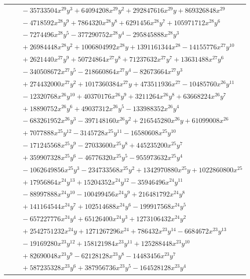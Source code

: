 \documentclass[11pt]{article}
\begin{document}
\begin{longtable}{@{}ll@{}}
 & $\quad -35733504x^{29}y^{3}+64094208x^{29}y^{2}+292847616x^{29}y+869326848x^{29}$\\
 & $\quad -4718592x^{28}y^{9}+7864320x^{28}y^{8}+6291456x^{28}y^{7}+105971712x^{28}y^{6}$\\
 & $\quad -7274496x^{28}y^{5}-377290752x^{28}y^{4}-295845888x^{28}y^{3}$\\
 & $\quad +26984448x^{28}y^{2}+1006804992x^{28}y+1391161344x^{28}-14155776x^{27}y^{10}$\\
 & $\quad +2621440x^{27}y^{9}+50724864x^{27}y^{8}+71237632x^{27}y^{7}+13631488x^{27}y^{6}$\\
 & $\quad -340508672x^{27}y^{5}-218660864x^{27}y^{4}-82673664x^{27}y^{3}$\\
 & $\quad +274432000x^{27}y^{2}+1017360384x^{27}y+473511936x^{27}-10485760x^{26}y^{11}$\\
 & $\quad -12320768x^{26}y^{10}+40370176x^{26}y^{9}+3211264x^{26}y^{8}+63668224x^{26}y^{7}$\\
 & $\quad +18890752x^{26}y^{6}+49037312x^{26}y^{5}-133988352x^{26}y^{4}$\\
 & $\quad -683261952x^{26}y^{3}-397148160x^{26}y^{2}+216545280x^{26}y+61099008x^{26}$\\
 & $\quad +7077888x^{25}y^{12}-3145728x^{25}y^{11}-16580608x^{25}y^{10}$\\
 & $\quad -171245568x^{25}y^{9}-27033600x^{25}y^{8}+445235200x^{25}y^{7}$\\
 & $\quad +359907328x^{25}y^{6}-46776320x^{25}y^{5}-955973632x^{25}y^{4}$\\
 & $\quad -1062649856x^{25}y^{3}-234733568x^{25}y^{2}+1342970880x^{25}y+1022860800x^{25}$\\
 & $\quad +17956864x^{24}y^{13}+15204352x^{24}y^{12}-35946496x^{24}y^{11}$\\
 & $\quad -88997888x^{24}y^{10}-100499456x^{24}y^{9}+216481792x^{24}y^{8}$\\
 & $\quad +141164544x^{24}y^{7}+102514688x^{24}y^{6}-199917568x^{24}y^{5}$\\
 & $\quad -657227776x^{24}y^{4}+65126400x^{24}y^{3}+1273106432x^{24}y^{2}$\\
 & $\quad +2542751232x^{24}y+1271267296x^{24}+786432x^{23}y^{14}-6684672x^{23}y^{13}$\\
 & $\quad -19169280x^{23}y^{12}+158121984x^{23}y^{11}+125288448x^{23}y^{10}$\\
 & $\quad +82690048x^{23}y^{9}-62128128x^{23}y^{8}-14483456x^{23}y^{7}$\\
 & $\quad +587235328x^{23}y^{6}+387956736x^{23}y^{5}-164528128x^{23}y^{4}$\\

\end{longtable}
\end{document}
